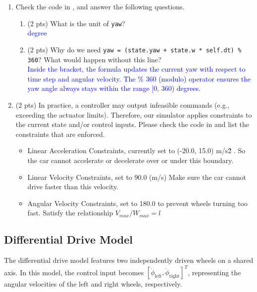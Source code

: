 \documentclass[11pt]{article}
\begin{document}
\begin{enumerate}
    \item \noindent\textbf{\faPen} Check the code in \textcolor{teal}{\texttt{\allowbreak{}}}, and answer the following questions.
          \begin{enumerate}
              \item (2 pts) What is the unit of \texttt{yaw}? \\
                    \textcolor{blue}{degree}
              \item (2 pts) Why do we need \texttt{yaw = (state.yaw + state.w * self.dt) \% 360}? What would happen without this line? \\
                    \textcolor{blue}{Inside the bracket, the formula updates the current yaw with respect to time step and angular velocity. The \% 360 (modulo) operator ensures the yaw angle always stays within the range [0, 360) degrees.}
          \end{enumerate}

    \item \noindent\textbf{\faPen}  (2 pts) In practice, a controller may output infeasible commands (e.g., exceeding the actuator limits).
          Therefore, our simulator applies constraints to the current state and/or control inputs.
          Please check the code in \textcolor{teal}{\texttt{\allowbreak{}}} and list the constraints that are enforced.
          \begin{itemize}
            \color{blue}
                \item Linear Acceleration Constraints, currently set to (-20.0, 15.0) m/s\^2 . So the car cannot accelerate or decelerate over or under this boundary.
                \item Linear Velocity Constraints, set to 90.0 (m/s) Make sure the car cannot drive faster than this velocity.
                \item Angular Velocity Constraints, set to 180.0 to prevent wheels turning too fast. Satisfy the relationship $V_{max} / W_{max} = l$
          \end{itemize}
\end{enumerate}

\subsection{Differential Drive Model}
\noindent The differential drive model features two independently driven wheels on a shared axis. In this model, the control input becomes $[\dot{\phi}_{\mathrm{left}}, \dot{\phi}_{\mathrm{right}}]^T$, representing the angular velocities of the left and right wheels, respectively. \\
\end{document}
